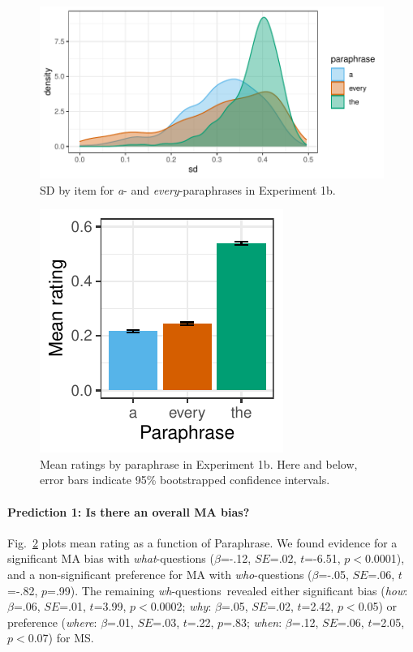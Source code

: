\documentclass[12pt,letterpaper,table,svgnames,dvipsnames]{article}
\newcommand{\figref}[1]{Fig.~\ref{#1}}
\newcommand{\whqs}{\emph{wh}-questions~}
\begin{document}
\begin{figure}[h!]
\centering
\includegraphics[scale=1]{figures/ex1b_denisty_sd.pdf}
\caption{SD by item for \emph{a}- and \emph{every}-paraphrases in Experiment 1b.}
\label{ex1b_density_sd}
\end{figure}

\begin{figure}[h!]
\centering
\includegraphics[scale=1]{figures/overall_eq_context.pdf}
\caption{Mean ratings by paraphrase in Experiment 1b. Here and below, error bars indicate 95\% bootstrapped confidence intervals.}
\label{ex1b_overall}
\end{figure}


\paragraph{Prediction 1: Is there an overall MA bias?}
\figref{ex1b_overall} plots mean rating as a function of Paraphrase. We found evidence for a significant MA bias with \emph{what}-questions ($\beta$=-.12, $SE$=.02, $t$=-6.51, $p<$0.0001), and a non-significant preference for MA with \emph{who}-questions ($\beta$=-.05, $SE$=.06, $t$=-.82, $p$=.99). The remaining \whqs revealed either significant bias (\emph{how}: $\beta$=.06, $SE$=.01, $t$=3.99, $p<$0.0002; \emph{why}: $\beta$=.05, $SE$=.02, $t$=2.42, $p<$0.05) or preference (\emph{where}: $\beta$=.01, $SE$=.03, $t$=.22, $p$=.83; \emph{when}: $\beta$=.12, $SE$=.06, $t$=2.05, $p<$0.07) for MS. 
\end{document}
